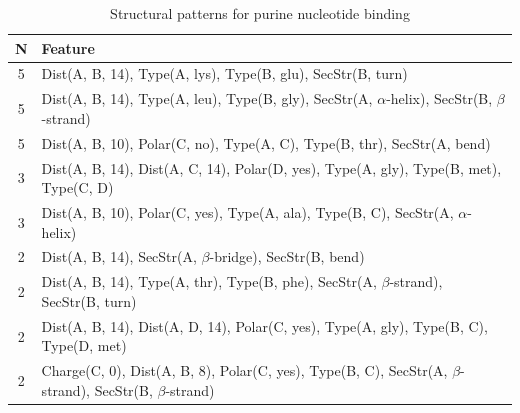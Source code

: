 \documentclass[11pt,twoside,a4paper]{book}
\begin{document}
\begin{table}\begin{tabularx}{\textwidth}{cX}\textbf{N} & \textbf{Feature} \\ \hline  
5 & Dist(A, B, 14),  Type(A, lys), Type(B, glu), SecStr(B, turn)\\ \hline 
5 & Dist(A, B, 14),  Type(A, leu), Type(B, gly), SecStr(A, $\alpha$-helix), SecStr(B, $\beta$-strand)\\ \hline 
5 & Dist(A, B, 10), Polar(C, no),  Type(A, C), Type(B, thr), SecStr(A, bend)\\ \hline 
3 & Dist(A, B, 14), Dist(A, C, 14), Polar(D, yes),  Type(A, gly), Type(B, met), \newline Type(C, D)\\ \hline 
3 & Dist(A, B, 10), Polar(C, yes),  Type(A, ala), Type(B, C), SecStr(A, $\alpha$-helix)\\ \hline 
2 & Dist(A, B, 14),  SecStr(A, $\beta$-bridge), SecStr(B, bend)\\ \hline 
2 & Dist(A, B, 14),  Type(A, thr), Type(B, phe), SecStr(A, $\beta$-strand), SecStr(B, turn)\\ \hline 
2 & Dist(A, B, 14), Dist(A, D, 14), Polar(C, yes),  Type(A, gly), Type(B, C), \newline Type(D, met)\\ \hline 
2 & Charge(C, 0), Dist(A, B, 8), Polar(C, yes),  Type(B, C), SecStr(A, $\beta$-strand), \newline SecStr(B, $\beta$-strand)\\ \hline 
 \end{tabularx}\caption{Structural patterns for purine nucleotide binding}\label{tab:purine_nucleotide_binding}\end{table}
\end{document}
